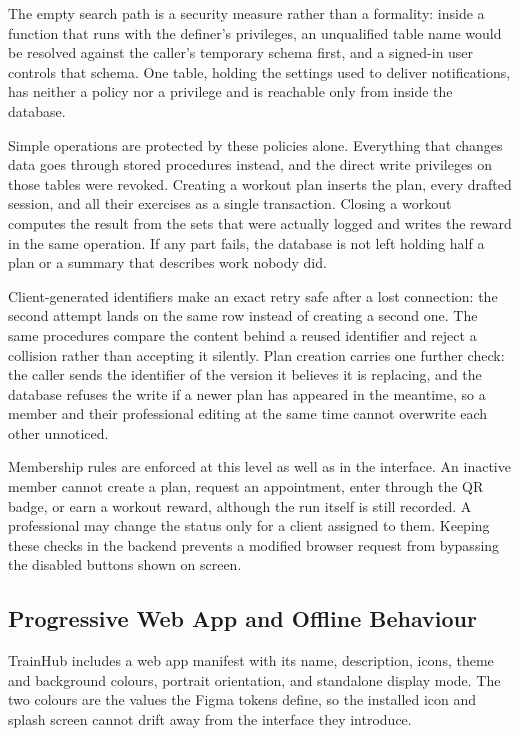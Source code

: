 The empty search path is a security measure rather than a formality: inside a function that runs with the definer's privileges, an unqualified table name would be resolved against the caller's temporary schema first, and a signed-in user controls that schema. One table, holding the settings used to deliver notifications, has neither a policy nor a privilege and is reachable only from inside the database.

Simple operations are protected by these policies alone. Everything that changes data goes through stored procedures instead, and the direct write privileges on those tables were revoked. Creating a workout plan inserts the plan, every drafted session, and all their exercises as a single transaction. Closing a workout computes the result from the sets that were actually logged and writes the reward in the same operation. If any part fails, the database is not left holding half a plan or a summary that describes work nobody did.

Client-generated identifiers make an exact retry safe after a lost connection: the second attempt lands on the same row instead of creating a second one. The same procedures compare the content behind a reused identifier and reject a collision rather than accepting it silently. Plan creation carries one further check: the caller sends the identifier of the version it believes it is replacing, and the database refuses the write if a newer plan has appeared in the meantime, so a member and their professional editing at the same time cannot overwrite each other unnoticed.

Membership rules are enforced at this level as well as in the interface. An inactive member cannot create a plan, request an appointment, enter through the QR badge, or earn a workout reward, although the run itself is still recorded. A professional may change the status only for a client assigned to them. Keeping these checks in the backend prevents a modified browser request from bypassing the disabled buttons shown on screen.

\subsection{Progressive Web App and Offline Behaviour}\label{subsect:PWAOffline}

TrainHub includes a web app manifest with its name, description, icons, theme and background colours, portrait orientation, and standalone display mode. The two colours are the values the Figma tokens define, so the installed icon and splash screen cannot drift away from the interface they introduce.

